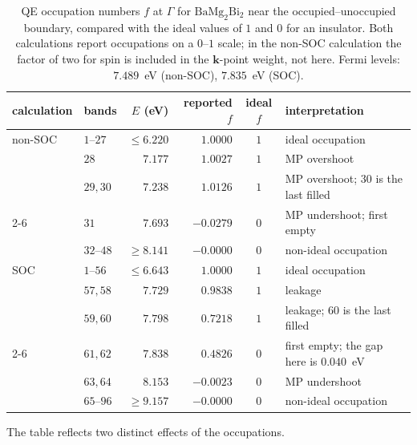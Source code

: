 \documentclass[11pt]{article}
\newcommand{\kk}{\mathbf{k}}
\newcommand{\bmb}{\mathrm{BaMg_2Bi_2}}
\begin{document}
\begin{table}[htbp]
\centering
\caption{QE occupation numbers $f$ at $\Gamma$ for $\bmb$ near the occupied--unoccupied boundary,
compared with the ideal values of $1$ and $0$ for an insulator. Both calculations report occupations
on a $0$--$1$ scale; in the non-SOC calculation the factor of two for spin is included in the
$\kk$-point weight, not here. Fermi levels: $7.489$~eV (non-SOC), $7.835$~eV
(SOC).}\label{tab:occ}
\setlength{\tabcolsep}{5pt}
\begin{tabular}{@{}llrrcl@{}}
\toprule
calculation & bands & $E$ (eV) & reported $f$ & ideal $f$ & interpretation \\
\midrule
non-SOC & $1$--$27$   & $\le 6.220$ & $1.0000$   & $1$ & ideal occupation \\
        & $28$        & $7.177$     & $1.0027$   & $1$ & MP overshoot \\
        & $29,30$     & $7.238$     & $1.0126$   & $1$ & MP overshoot; $30$ is the last filled \\
\cmidrule(l){2-6}
        & $31$        & $7.693$     & $-0.0279$  & $0$ & MP undershoot; first empty \\
        & $32$--$48$  & $\ge 8.141$ & $-0.0000$  & $0$ & non-ideal occupation \\
\midrule
SOC     & $1$--$56$   & $\le 6.643$ & $1.0000$   & $1$ & ideal occupation \\
        & $57,58$     & $7.729$     & $0.9838$   & $1$ & leakage \\
        & $59,60$     & $7.798$     & $0.7218$   & $1$ & leakage; $60$ is the last filled \\
\cmidrule(l){2-6}
        & $61,62$     & $7.838$     & $0.4826$   & $0$ & first empty; the gap here is $0.040$~eV \\
        & $63,64$     & $8.153$     & $-0.0023$  & $0$ & MP undershoot \\
        & $65$--$96$  & $\ge 9.157$ & $-0.0000$  & $0$ & non-ideal occupation \\
\bottomrule
\end{tabular}
\end{table}

\noindent The table reflects two distinct effects of the occupations.
\end{document}
